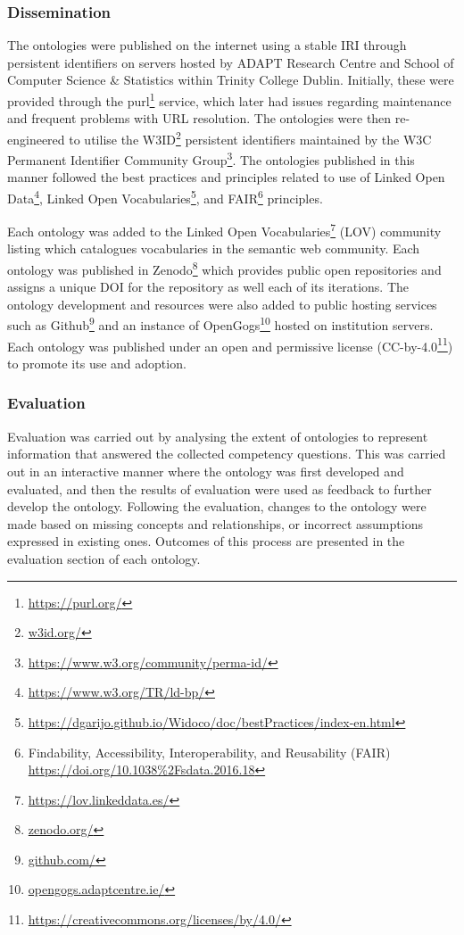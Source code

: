 \subsubsection*{Dissemination}
The ontologies were published on the internet using a stable IRI through persistent identifiers on servers hosted by ADAPT Research Centre and School of Computer Science \& Statistics within Trinity College Dublin. Initially, these were provided through the purl\footnote{\url{https://purl.org/}} service, which later had issues regarding maintenance and frequent problems with URL resolution. The ontologies were then re-engineered to utilise the W3ID\footnote{\url{w3id.org/}} persistent identifiers maintained by the W3C Permanent Identifier Community Group\footnote{\url{https://www.w3.org/community/perma-id/}}. The ontologies published in this manner followed the best practices and principles related to use of Linked Open Data\footnote{\url{https://www.w3.org/TR/ld-bp/}}, Linked Open Vocabularies\footnote{\url{https://dgarijo.github.io/Widoco/doc/bestPractices/index-en.html}}, and FAIR\footnote{Findability, Accessibility, Interoperability, and Reusability (FAIR) \url{https://doi.org/10.1038\%2Fsdata.2016.18}} principles.

Each ontology was added to the Linked Open Vocabularies\footnote{\url{https://lov.linkeddata.es/}} (LOV) community listing which catalogues vocabularies in the semantic web community. Each ontology was published in Zenodo\footnote{\url{zenodo.org/}} which provides public open repositories and assigns a unique DOI for the repository as well each of its iterations. The ontology development and resources were also added to public hosting services such as Github\footnote{\url{github.com/}} and an instance of OpenGogs\footnote{\url{opengogs.adaptcentre.ie/}} hosted on institution servers. Each ontology was published under an open and permissive license (CC-by-4.0\footnote{\url{https://creativecommons.org/licenses/by/4.0/}}) to promote its use and adoption.

\subsubsection*{Evaluation}
Evaluation was carried out by analysing the extent of ontologies to represent information that answered the collected competency questions. This was carried out in an interactive manner where the ontology was first developed and evaluated, and then the results of evaluation were used as feedback to further develop the ontology. Following the evaluation, changes to the ontology were made based on missing concepts and relationships, or incorrect assumptions expressed in existing ones. Outcomes of this process are presented in the evaluation section of each ontology.


